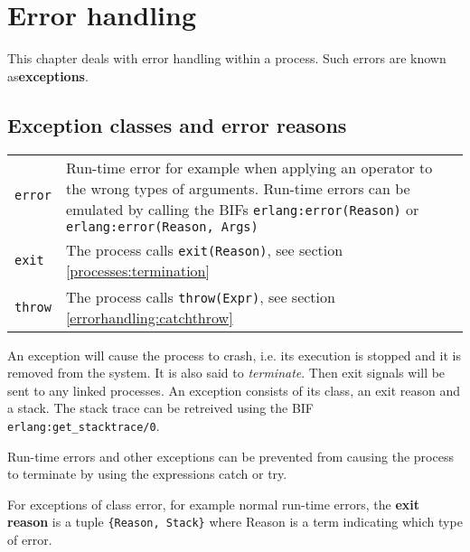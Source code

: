 \chapter{Error handling}
\label{errorhandling}

This chapter deals with error handling within a process. Such errors
are known as\textbf{exceptions}.


\section{Exception classes and error reasons}

\begin{center}
\begin{tabular}{|>{\raggedright}p{49pt}|>{\raggedright}p{277pt}|}
\hline
\multicolumn{2}{|p{326pt}|}{Exception classes}\tabularnewline
\hline
\texttt{error} & Run-time error for example when applying an operator to the wrong types of arguments. Run-time errors can be emulated by calling the BIFs \texttt{erlang:error(Reason)} or \texttt{erlang:error(Reason, Args)} \tabularnewline
\hline
\texttt{exit}  & The process calls \texttt{exit(Reason)}, see section \ref{processes:termination}\tabularnewline
\hline
\texttt{throw}  & The process calls \texttt{throw(Expr)}, see section \ref{errorhandling:catchthrow}\tabularnewline
\hline
\end{tabular}
\end{center}

An exception will cause the process to crash, i.e. its execution is
stopped and it is removed from the system. It is also said to
\textit{terminate}. Then exit signals will be sent to any linked
processes.\textit{ }An exception consists of its class, an exit reason
and a stack. The stack trace can be retreived using the BIF
\texttt{erlang:get\_stacktrace/0}.

Run-time errors and other exceptions can be prevented from causing the
process to terminate by using the expressions catch or try.

For exceptions of class error, for example normal run-time errors, the
\textbf{exit reason} is a tuple \texttt{\{Reason, Stack\}} where
Reason is a term indicating which type of error.


